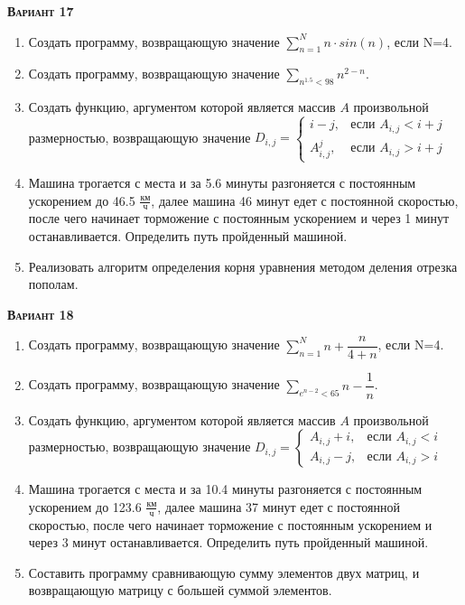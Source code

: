 \textsc{\textbf{Вариант 17}}
\begin{enumerate}
\item  Создать программу, возвращающую значение $\sum\limits_{n=1}^{N} n \cdot sin(n)                $, если N=4. 
\item  Создать программу, возвращающую значение $\sum\limits_{n^{1.5}<  98} n^{2-n}                       $. 
\item Создать функцию, аргументом которой является массив $A$ произвольной размерностью, возвращающую значение $D_{i,j}=\begin{cases} i-j, & \text{если } {A_{i,j}}<i+j \\  A_{i,j}^j, & \text{если } {A_{i,j}}>i+j \end{cases}                              $ 
\item Машина трогается с места и за  5.6 минуты разгоняется с постоянным ускорением до 46.5 ${\frac{км}{ч}}$, далее машина   46 минут едет с постоянной скоростью, после чего начинает торможение с постоянным ускорением и через   1 минут останавливается. Определить путь пройденный машиной.  \item Реализовать алгоритм определения корня уравнения методом деления отрезка пополам.                                                                                                                                                                                              

\end{enumerate}
\textsc{\textbf{Вариант 18}}
\begin{enumerate}
\item  Создать программу, возвращающую значение $\sum\limits_{n=1}^{N} n+\dfrac{n}{4+n}              $, если N=4. 
\item  Создать программу, возвращающую значение $\sum\limits_{e^{n-2}<  65} {n -\dfrac{1}{n}}             $. 
\item Создать функцию, аргументом которой является массив $A$ произвольной размерностью, возвращающую значение $D_{i,j}=\begin{cases} A_{i,j}+i, & \text{если } {A_{i,j}}<i \\  A_{i,j}-j, & \text{если } {A_{i,j}}>i \end{cases}                            $ 
\item Машина трогается с места и за 10.4 минуты разгоняется с постоянным ускорением до 123.6 ${\frac{км}{ч}}$, далее машина   37 минут едет с постоянной скоростью, после чего начинает торможение с постоянным ускорением и через   3 минут останавливается. Определить путь пройденный машиной.  \item Составить программу сравнивающую сумму элементов двух матриц, и возвращающую матрицу с большей суммой элементов.                                                                                                                                      

\end{enumerate}
